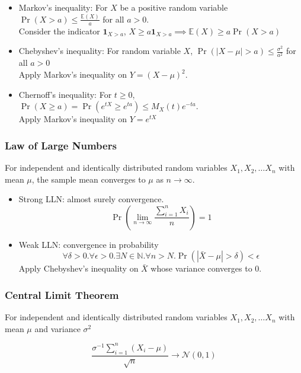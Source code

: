 \documentclass{article}
\theoremstyle{definition}
\theoremstyle{remark}
\newcommand{\E}{\mathbb{E}}
\newcommand{\Norm}{\mathcal{N}}
\begin{document}
\begin{itemize}
	\item Markov's inequality: For \(X\) be a positive random variable \( \Pr(X>a) \leq \frac{\E(X)}{a} \) for all \(a>0\).\\
	      Consider the indicator \(\mathbf{1}_{X>a}\), \( X \geq a\mathbf{1}_{X>a} \implies \E(X) \geq a \Pr(X>a) \)
	\item Chebyshev's inequality: For random variable \(X\), \(\Pr(|X-\mu|>a) \leq \frac{\sigma^2}{a^2}\) for all \(a>0\)\\
	      Apply Markov's inequality on \(Y={(X-\mu)}^2\).
	\item Chernoff's inequality: For \(t\geq 0\), \(\Pr(X\geq a) = \Pr(e^{tX}\geq e^{ta}) \leq M_X(t)e^{-ta}\).\\
	      Apply Markov's inequality on \(Y=e^{tX}\)
\end{itemize}

\subsubsection{Law of Large Numbers}

For independent and identically distributed random variables \(X_1,X_2,\ldots X_n\) with mean \(\mu\), the sample mean converges to \(\mu\) as \(n\to\infty\).

\begin{itemize}
	\item Strong LLN: almost surely convergence.
	      \[
		      \Pr\left( \lim_{n\to\infty} \frac{\sum_{i=1}^n X_i}{n} \right) = 1
	      \]
	\item Weak LLN: convergence in probability
	      \[
		      \forall \delta>0
		      .
		      \forall \epsilon>0
		      .
		      \exists N\in\mathbb{N}
		      .
		      \forall n>N
		      .
		      \Pr(|\bar{X}-\mu|>\delta) < \epsilon
	      \]
	      Apply Chebyshev's inequality on \(\bar{X}\) whose variance converges to 0.
\end{itemize}

\subsubsection{Central Limit Theorem}

For independent and identically distributed random variables \(X_1,X_2,\ldots X_n\) with mean \(\mu\) and variance \(\sigma^2\)

\[
	\frac{\sigma^{-1}\sum_{i=1}^n (X_i-\mu)}{\sqrt n} \to \Norm(0,1)
\]
\end{document}
